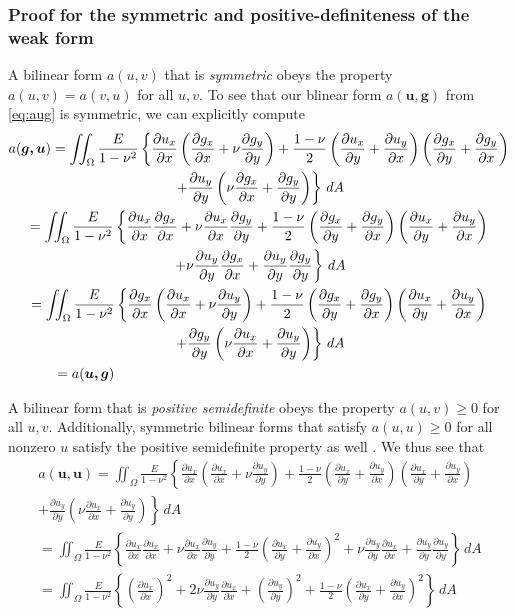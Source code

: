 \documentclass[11pt]{article}
\newcommand\p[2]{\frac{\partial #1}{\partial #2}}
\begin{document}
\subsubsection*{Proof for the symmetric and positive-definiteness of the weak form}
A bilinear form $a(u,v)$ that is \emph{symmetric} obeys the property $a(u,v) = a(v,u)$ for all $u,v$. To see that our blinear form $a(\bm{u,g})$ from \eqref{eq:aug} is symmetric, we can explicitly compute
\begin{multline}
a(\bm{g,u}) =
\iint_\Omega \frac{E}{1-\nu^2} \left\{
\p{u_x}{x} \left( \p{g_x}{x} + \nu\p{g_y}{y} \right)
+ \frac{1-\nu}{2} \left( \p{u_x}{y} + \p{u_y}{x} \right)
\left( \p{g_x}{y} + \p{g_y}{x} \right) \right. \\ \left.
+ \p{u_y}{y} \left(\nu\p{g_x}{x} + \p{g_y}{y} \right)
\right\} \, dA \\
= \iint_\Omega \frac{E}{1-\nu^2} \left\{
\p{u_x}{x} \p{g_x}{x} + \nu \p{u_x}{x} \p{g_y}{y}
+ \frac{1-\nu}{2} \left( \p{g_x}{y} + \p{g_y}{x} \right)
\left( \p{u_x}{y} + \p{u_y}{x} \right) \right. \\ \left.
+ \nu\p{u_y}{y}\p{g_x}{x} + \p{u_y}{y}\p{g_y}{y}
\right\} \, dA \\
=   \iint_\Omega \frac{E}{1-\nu^2} \left\{
\p{g_x}{x} \left( \p{u_x}{x} + \nu\p{u_y}{y} \right)
+ \frac{1-\nu}{2} \left( \p{g_x}{y} + \p{g_y}{x} \right)
\left( \p{u_x}{y} + \p{u_y}{x} \right) \right. \\ \left.
+ \p{g_y}{y} \left(\nu\p{u_x}{x} + \p{u_y}{y} \right)
\right\} \, dA \\
\hspace{3.5em} = a(\bm{u,g}) \hfill
\end{multline}

A bilinear form that is \emph{positive semidefinite} obeys the property $a(u,v) \ge 0$ for all $u,v$. Additionally, symmetric bilinear forms that satisfy $a(u,u) \ge 0$ for all nonzero $u$ satisfy the positive semidefinite property as well \cite{mathworld}. We thus see that
\begin{multline}
a(\bm{u,u}) =
\iint_\Omega \frac{E}{1-\nu^2} \left\{
\p{u_x}{x} \left( \p{u_x}{x} + \nu\p{u_y}{y} \right)
+ \frac{1-\nu}{2} \left( \p{u_x}{y} + \p{u_y}{x} \right)
\left( \p{u_x}{y} + \p{u_y}{x} \right) \right. \\ \left.
+ \p{u_y}{y} \left(\nu\p{u_x}{x} + \p{u_y}{y} \right)
\right\} \, dA \\
= \iint_\Omega \frac{E}{1-\nu^2} \left\{
\p{u_x}{x} \p{u_x}{x} + \nu\p{u_x}{x}\p{u_y}{y}
+ \frac{1-\nu}{2} \left( \p{u_x}{y} + \p{u_y}{x} \right)^2 
+ \nu\p{u_y}{y}\p{u_x}{x} + \p{u_y}{y} \p{u_y}{y}
\right\} \, dA \\
= \iint_\Omega \frac{E}{1-\nu^2} \left\{
\left( \p{u_x}{x} \right)^2 + 2\nu\p{u_y}{y}\p{u_x}{x} + \left( \p{u_y}{y} \right)^2
+ \frac{1-\nu}{2} \left( \p{u_x}{y} + \p{u_y}{x} \right)^2
\right\} \, dA \\
\end{multline}
\end{document}
